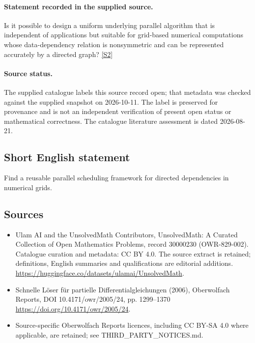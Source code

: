 \documentclass[11pt]{article}
\begin{document}
\paragraph{Statement recorded in the supplied source.}
Is it possible to design a uniform underlying parallel algorithm that is independent of applications but suitable for grid-based numerical computations whose data-dependency relation is nonsymmetric and can be represented accurately by a directed graph? \href{https://doi.org/10.4171/owr/2005/24}{[S2]}
\paragraph{Source status.}
The supplied catalogue labels this source record open; that metadata was checked against the supplied snapshot on 2026-10-11. The label is preserved for provenance and is not an independent verification of present open status or mathematical correctness. The catalogue literature assessment is dated 2026-08-21.
\subsection{Short English statement}
Find a reusable parallel scheduling framework for directed dependencies in numerical grids.
\subsection{Sources}
\begin{itemize}
\item[S1] Ulam AI and the UnsolvedMath Contributors, UnsolvedMath: A Curated Collection of Open Mathematics Problems, record 30000230 (OWR-829-002). Catalogue curation and metadata: CC BY 4.0. The source extract is retained; definitions, English summaries and qualifications are editorial additions.
\url{https://huggingface.co/datasets/ulamai/UnsolvedMath}.
\item[S2] Schnelle Löser für partielle Differentialgleichungen (2006), Oberwolfach Reports, DOI 10.4171/owr/2005/24, pp. 1299--1370
\url{https://doi.org/10.4171/owr/2005/24}.
\item Source-specific Oberwolfach Reports licences, including CC BY-SA 4.0 where applicable, are retained; see THIRD\_PARTY\_NOTICES.md.
\end{itemize}
\end{document}
